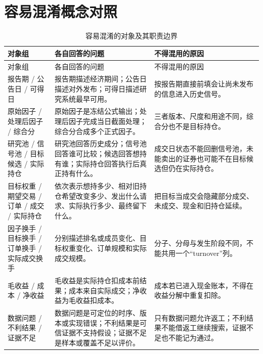 \section{容易混淆概念对照}

\begingroup
\footnotesize
\setlength{\tabcolsep}{3pt}
\begin{longtable}{@{}p{4.0cm}p{5.4cm}p{5.6cm}@{}}
\caption{容易混淆的对象及其职责边界}\label{tab:appA-confusable-objects}\\
\toprule
对象组 & 各自回答的问题 & 不得混用的原因 \\
\midrule
\endfirsthead
\toprule
对象组 & 各自回答的问题 & 不得混用的原因 \\
\midrule
\endhead
报告期 / 公告日 / 可得日 & 报告期描述经济期间；公告日描述对外发布；可得日描述研究系统最早可用。 & 按报告期直接前填会让尚未发布的信息进入历史信号。 \\
原始因子 / 处理后因子 / 综合分 & 原始因子是冻结公式输出；处理后因子完成当日截面处理；综合分合成多个正式因子。 & 三者版本、尺度和用途不同，综合分也不是目标持仓。 \\
研究池 / 信号池 / 目标候选 / 实际持仓 & 研究池回答历史成分；信号池回答谁可比较；候选回答想持有谁；实际持仓回答执行后真正持有什么。 & 成交日状态不能回删信号池，未能卖出的证券也可能不在目标候选但仍在实际持仓。 \\
目标权重 / 期望交易 / 订单 / 成交 / 实际持仓 & 依次表示想持多少、相对旧持仓希望改变多少、发出什么请求、实际执行多少、最终留下什么。 & 把目标当成交会隐藏部分成交、未成交、现金和旧持仓延续。 \\
因子换手 / 目标换手 / 订单换手 / 实际成交换手 & 分别描述排名或成员变化、目标权重变化、订单规模和实际成交规模。 & 分子、分母与发生阶段不同，不能共用一个“turnover”列。 \\
毛收益 / 成本 / 净收益 & 毛收益是实际持仓扣成本前结果；成本来自实际成交；净收益为毛收益扣成本。 & 成本若已进入现金账本，不得在收益分解中重复扣除。 \\
数据问题 / 不利结果 / 证据不足 & 数据问题是可定位的时序、版本或实现错误；不利结果是可信证据不支持假设；证据不足是样本或覆盖不足以评价。 & 只有数据问题允许返工；不利结果不能借返工继续搜索，证据不足也不能记为通过。 \\
\bottomrule
\end{longtable}
\endgroup

